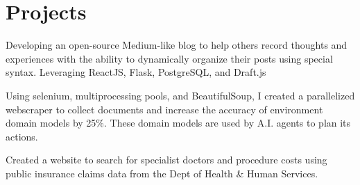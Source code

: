 \documentclass[]{deedy-resume-openfont}
\begin{document}
\begin{minipage}[t]{0.66\textwidth}
\section{Projects}


\begin{tightemize}
\item Developing an open-source Medium-like blog to help others record thoughts and experiences with the ability to dynamically organize their posts using special syntax. Leveraging ReactJS, Flask, PostgreSQL, and Draft.js 
\end{tightemize}
\sectionsep


\begin{tightemize}
\item Using selenium, multiprocessing pools, and BeautifulSoup, I created a parallelized webscraper to collect documents and increase the accuracy of environment domain models by 25\%. These domain models are used by A.I. agents to plan its actions.
\end{tightemize}
\sectionsep

\begin{tightemize}
\item Created a website to search for specialist doctors and procedure costs using public insurance claims data from the Dept of Health \& Human Services.
\end{tightemize}

\end{minipage}
\end{document}
